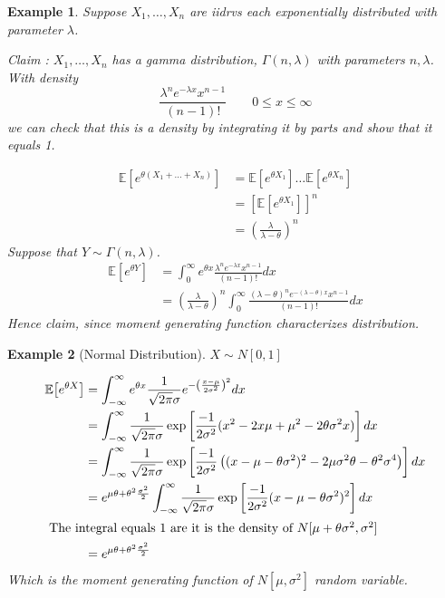 \documentclass{notes}
\theoremstyle{plain}
\newtheorem*{example}{Example}
\newcommand{\bE}{\mathbb{E}}
\newcommand{\expect}[1]{\bE\!\left[#1\right]}
\begin{document}
\begin{example}
Suppose $X_1,\dots,X_n$ are iidrvs each exponentially distributed
with parameter $\lambda$.

Claim : $X_1,\dots,X_n$ has a gamma distribution, $\Gamma(n,\lambda)$
 with parameters $n,\lambda$. With density
\[
\frac{\lambda^ne^{-\lambda x}x^{n-1}}{(n-1)!} \qquad 0 \leq x \le \infty
\]
we can check that this is a density by integrating it by parts and
show that it equals 1.

\begin{align*}
\expect{e^{\theta(X_1 +\dots +X_n)}} &= \expect{e^{\theta X_1}}\dots
\expect{e^{\theta X_n}}\\
&= \left[\expect{e^{\theta X_1}} \right]^n\\
&= \left( \frac{\lambda}{\lambda - \theta}\right)^n
\end{align*}
Suppose that $ Y \sim \Gamma(n,\lambda)$.
\begin{align*}
\expect{e^{\theta Y}} &= \int_0^{\infty}e^{\theta
  x}\frac{\lambda^ne^{-\lambda x}x^{n-1}}{(n-1)!}dx\\
&= \left( \frac{\lambda}{\lambda - \theta}\right)^n  \int_0^{\infty}
\frac{(\lambda - \theta)^ne^{-(\lambda -\theta)x}x^{n-1}}{(n-1)!}dx
\end{align*}
Hence claim, since moment generating function characterizes distribution.
 \end{example}

\begin{example}[Normal Distribution]

$ X \sim N[0,1]$

\begin{align*}
\expect{e^{\theta X}} & = \int_{-\infty}^{\infty}e^{\theta x}
\frac{1}{\sqrt{2\pi}\sigma}e^{-\left(\frac{x-\mu}{2\sigma^2}
  \right)^2}dx\\
&= \int_{-\infty}^{\infty}\frac{1}{\sqrt{2\pi}\sigma}
\exp\left[\frac{-1}{2\sigma^2}(x^2 - 2x\mu +\mu^2 - 2\theta
    \sigma^2x)\right] dx\\
&= \int_{-\infty}^{\infty}\frac{1}{\sqrt{2\pi}\sigma}
\exp\left[\frac{-1}{2\sigma^2} \left((x-\mu-\theta\sigma^2)^2 -
    2\mu\sigma^2\theta - \theta^2\sigma^4\right)\right]dx\\
&= e^{\mu\theta +\theta^2\frac{\sigma^2}{2}}
\int_{-\infty}^{\infty}\frac{1}{\sqrt{2\pi}\sigma}
\exp\left[\frac{-1}{2\sigma^2} (x-\mu-\theta\sigma^2)^2\right]dx\\
\intertext{ The integral equals 1 are it is the density of $N[\mu
  +\theta\sigma^2, \sigma^2]$}
&= e^{\mu\theta +\theta^2\frac{\sigma^2}{2}}\\
\end{align*}
Which is the moment generating function of $N[\mu,\sigma^2]$ random variable.
\end{example}
\end{document}
